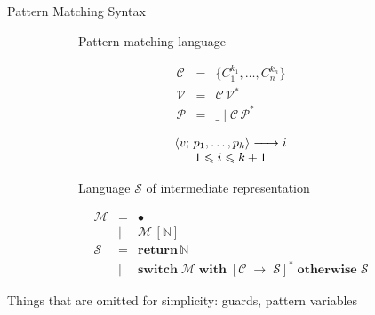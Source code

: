\documentclass[aspectratio=169
  , xcolor={svgnames}
  , hyperref={ colorlinks,citecolor=Blue
             , linkcolor=DarkRed,urlcolor=DarkBlue}
  , russian
  ]{beamer}
\def\transarrow{\xrightarrow}
\def\padding{\phantom{X}}
\def\subarrow{}
\newcommand{\trans}[3]{{#1}\transarrow{\padding{\textstyle #2}\padding}\subarrow{#3}}
\newcommand{\inbr}[1]{\left<{#1}\right>}
\newcommand{\primi}[1]{\ensuremath{\mathbf{#1}}}
\newcommand{\ir}{\ensuremath{\mathcal{S}}}
\begin{document}
\begin{frame}[fragile]{Pattern Matching Syntax}
\begin{figure}[ht]
\begin{subfigure}[t]{0.4\linewidth}
\begin{center}
Pattern matching language
\end{center}
\[
 \begin{array}{rcll}
    \mathcal{C} & = & \{ C_1^{k_1}, \dots, C_n^{k_n} \}\\
    \mathcal{V} & = & \mathcal{C}\,\mathcal{V}^*\\  
    \mathcal{P} & = & \_ \mid \mathcal{C}\,\mathcal{P}^*
 \end{array}
\]
\[
 \begin{array}{c}
\trans{\inbr{v;\,p_1,\dots,p_k}}{}{i}\\
1\leqslant i\leqslant k+1
 \end{array}
\]
\end{subfigure}
\hspace{0.5cm}
\begin{subfigure}[t]{0.5\linewidth}
\begin{center}
Language \ir{} of intermediate representation
\end{center}
\[
\begin{array}{rcl}
  \mathcal M & = & \bullet \\
  & \mid  & \mathcal M\,[\mathbb{N}] \\
  \ir & = & \primi{return}\,\mathbb{N} \\
  & \mid  & \primi{switch}\;\mathcal{M}\;\primi{with}\; [\mathcal{C}\; \primi{\rightarrow}\; \ir]^*\;\primi{otherwise}\;\ir
\end{array}
\]
\end{subfigure}
\end{figure}
\vspace{0.5cm}
Things that are omitted for simplicity: guards, pattern variables

\end{frame}
\end{document}

